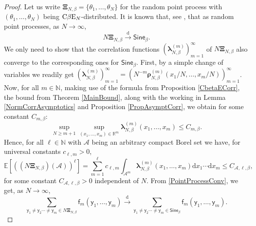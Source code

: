 \documentclass[]{article}
\begin{document}
\begin{proof}
Let us write $\boldsymbol{\Xi}_{N,\beta}=\{\theta_1,\dots,\theta_N\}$ for the random point process with $(\theta_1,\dots,\theta_N)$  being $\textnormal{C}\beta \textnormal{E}_N$-distributed.  It is known that, see \cite{ValkoViragCarousel,KillipStoiciu}, that as random point processes, as $N \to \infty$,
\begin{equation}\label{PointProcessConv}
N\boldsymbol{\Xi}_{N,\beta}\overset{\mathrm{d}}\longrightarrow \mathsf{Sine}_\beta.
\end{equation}
We only need to show that the correlation functions $(\boldsymbol{\lambda}_{N,\beta}^{(m)})_{m=1}^\infty$  of $N\boldsymbol{\Xi}_{N,\beta}$ also converge to the corresponding ones for $\mathsf{Sine}_\beta$. First, by a simple change of variables we readily get $(\boldsymbol{\lambda}_{N,\beta}^{(m)})_{m=1}^\infty=(N^{-m}\boldsymbol{\rho}_{N,\beta}^{(m)}(x_1/N,\dots,x_m/N))_{m=1}^\infty$.
Now, for all $m\in \mathbb{N}$, making use of the formula from Proposition \ref{CbetaECorr}, the bound from Theorem \ref{MainBound}, along with the working in Lemma \ref{NormCorrAsymptotics} and Proposition \ref{PropAsymptCorr}, we obtain for some constant $C_{m,\beta}$:
\begin{equation}\label{UniformBoundCorr}
\sup_{N\ge m+1} \sup_{(x_1,\dots,x_m)\in \mathbb{R}^m} \boldsymbol{\lambda}_{N,\beta}^{(m)}(x_1,\dots,x_m) \le C_{m,\beta}.
\end{equation}
Hence, for all $\ell \in \mathbb{N}$ with $\mathscr{A}$ being an arbitrary compact Borel set we have, for universal constants $c_{\ell, m} > 0$, 
\begin{equation}\label{UniformBoundMomentPoints}
\mathbb{E}\left[\left( (N\boldsymbol{\Xi}_{N,\beta})\left(\mathscr{A}\right)\right)^\ell\right]=\sum_{m=1}^\ell c_{\ell,m} \int_{\mathscr{A}^m}\boldsymbol{\lambda}_{N,\beta}^{(m)}(x_1,\dots,x_m)\mathrm{d}x_1\cdots \mathrm{d}x_m\le C_{\mathscr{A},\ell,\beta},
\end{equation}
for some constant $C_{\mathscr{A},\ell,\beta} > 0$ independent of $N$. From \eqref{PointProcessConv}, we get, as $N \to \infty$,
\begin{equation}\label{PointProcessSumConv}
\sum_{\mathsf{y}_1\neq \mathsf{y}_2\cdots \neq \mathsf{y}_m \in N \boldsymbol{\Xi}_{N,\beta}}\mathsf{f}_m(\mathsf{y}_1,\dots,\mathsf{y}_m)\overset{\mathrm{d}}{\longrightarrow} \sum_{\mathsf{y}_1\neq \mathsf{y}_2\cdots \neq \mathsf{y}_m \in  \mathsf{Sine}_\beta}\mathsf{f}_m(\mathsf{y}_1,\dots,\mathsf{y}_m).
\end{equation}

\end{proof}
\end{document}
